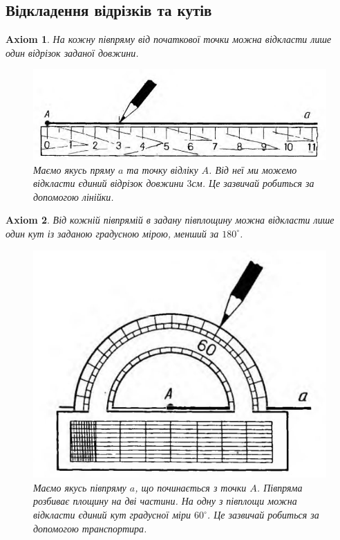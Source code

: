 \documentclass[a4paper, 10pt]{article}
\theoremstyle{theoremdd}
\theoremstyle{theoremdd}
\newtheorem{axiom}{Axiom}
\theoremstyle{theoremdd}
\theoremstyle{theoremdd}
\theoremstyle{theoremdd}
\theoremstyle{theoremdd}
\theoremstyle{theoremdd}
\theoremstyle{theoremdd}
\theoremstyle{theoremdd}
\begin{document}
\subsection{Відкладення відрізків та кутів}
\begin{axiom}
На кожну півпряму від початкової точки можна відкласти лише один відрізок заданої довжини.
\begin{figure}[H]
\centering
\includegraphics[scale=0.5]{ruler(from_Pogorelov).jpg}
\caption*{Маємо якусь пряму $a$ та точку відліку $A$. Від неї ми можемо відкласти єдиний відрізок довжини $3$см. Це зазвичай робиться за допомогою лінійки.}
\end{figure}
\end{axiom}

\begin{axiom}
Від кожній півпрямій в задану півплощину можна відкласти лише один кут із заданою градусною мірою, менший за $180^\circ$.
\begin{figure}[H]
\centering
\includegraphics[scale=0.5]{protractor(from_Pogorelov).jpg}
\caption*{Маємо якусь півпряму $a$, що починається з точки $A$. Півпряма розбиває площину на дві частини. На одну з півплощи можна відкласти єдиний кут градусної міри $60^\circ$. Це зазвичай робиться за допомогою транспортира.}
\end{figure}
\end{axiom}
\end{document}
